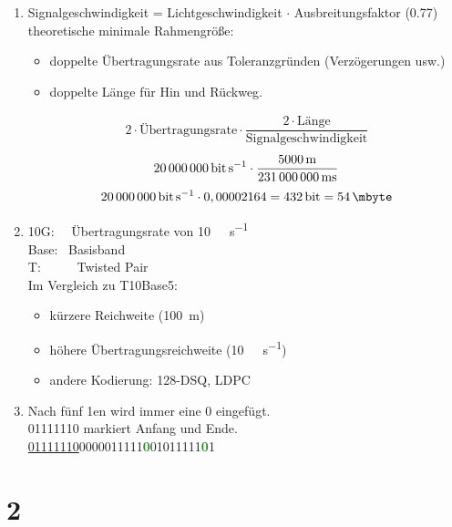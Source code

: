 \documentclass[ngerman]{scrartcl}
\begin{document}
\begin{enumerate}[label=\alph*)]
		\item
		Signalgeschwindigkeit = Lichtgeschwindigkeit $\cdot$ Ausbreitungsfaktor (0.77) \\
		\newline
		theoretische minimale Rahmengröße:
		\begin{itemize}
		  \item doppelte Übertragungsrate aus Toleranzgründen (Verzögerungen usw.)
		  \item doppelte Länge für Hin und Rückweg.
		\end{itemize}
		\begin{align*}
		  2 \cdot \text{Übertragungsrate} \cdot \dfrac{2 \cdot \text{Länge}}{\text{Signalgeschwindigkeit}}
		\end{align*}
		\begin{align*}
		  \SI{20000000}{\bit\per\s} \cdot \dfrac{\SI{5000}{\m}}{\SI{231000000}{\ms}}
		\end{align*}
		\begin{align*}
		  \SI{20000000}{\bit\per\s} \cdot 0,00002164 = \SI{432}{\bit} = \SI{54}{\mbyte}
		\end{align*}
		\item
		10G: \  \ Übertragungsrate von \SI{10}{\giga\bit\per\s} \\
		Base: \ Basisband \\
		T: \ \ \ \ \ Twisted Pair \\
		\newline
		Im Vergleich zu T10Base5:
		\begin{itemize}
			\item kürzere Reichweite (\SI{100}{\m})
			\item höhere Übertragungsreichweite (\SI{10}{\giga\bit\per\s})
			\item andere Kodierung: 128-DSQ, LDPC
		\end{itemize}
		\item
		Nach fünf 1en wird immer eine 0 eingefügt. \\
		01111110 markiert Anfang und Ende. \\
		\underline{01111110}0000011111{\textcolor{ForestGreen}{\textbf{0}}}01011111{\textcolor{ForestGreen}{\textbf{0}}}1 \\
	\end{enumerate}

\section*{2}
\end{document}
